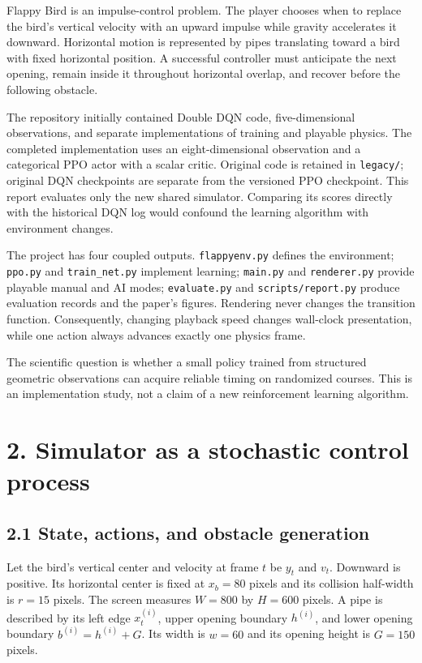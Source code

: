 \documentclass[
  11pt,
]{article}
\begin{document}
Flappy Bird is an impulse-control problem. The player chooses when to
replace the bird's vertical velocity with an upward impulse while
gravity accelerates it downward. Horizontal motion is represented by
pipes translating toward a bird with fixed horizontal position. A
successful controller must anticipate the next opening, remain inside it
throughout horizontal overlap, and recover before the following
obstacle.

The repository initially contained Double DQN code, five-dimensional
observations, and separate implementations of training and playable
physics. The completed implementation uses an eight-dimensional
observation and a categorical PPO actor with a scalar critic. Original
code is retained in \texttt{legacy/}; original DQN checkpoints are
separate from the versioned PPO checkpoint. This report evaluates only
the new shared simulator. Comparing its scores directly with the
historical DQN log would confound the learning algorithm with
environment changes.

The project has four coupled outputs. \texttt{flappyenv.py} defines the
environment; \texttt{ppo.py} and \texttt{train\_net.py} implement
learning; \texttt{main.py} and \texttt{renderer.py} provide playable
manual and AI modes; \texttt{evaluate.py} and \texttt{scripts/report.py}
produce evaluation records and the paper's figures. Rendering never
changes the transition function. Consequently, changing playback speed
changes wall-clock presentation, while one action always advances
exactly one physics frame.

The scientific question is whether a small policy trained from
structured geometric observations can acquire reliable timing on
randomized courses. This is an implementation study, not a claim of a
new reinforcement learning algorithm.

\section{2. Simulator as a stochastic control
process}\label{simulator-as-a-stochastic-control-process}

\subsection{2.1 State, actions, and obstacle
generation}\label{state-actions-and-obstacle-generation}

Let the bird's vertical center and velocity at frame \(t\) be \(y_t\)
and \(v_t\). Downward is positive. Its horizontal center is fixed at
\(x_b=80\) pixels and its collision half-width is \(r=15\) pixels. The
screen measures \(W=800\) by \(H=600\) pixels. A pipe is described by
its left edge \(x_t^{(i)}\), upper opening boundary \(h^{(i)}\), and
lower opening boundary \(b^{(i)}=h^{(i)}+G\). Its width is \(w=60\) and
its opening height is \(G=150\) pixels.
\end{document}
